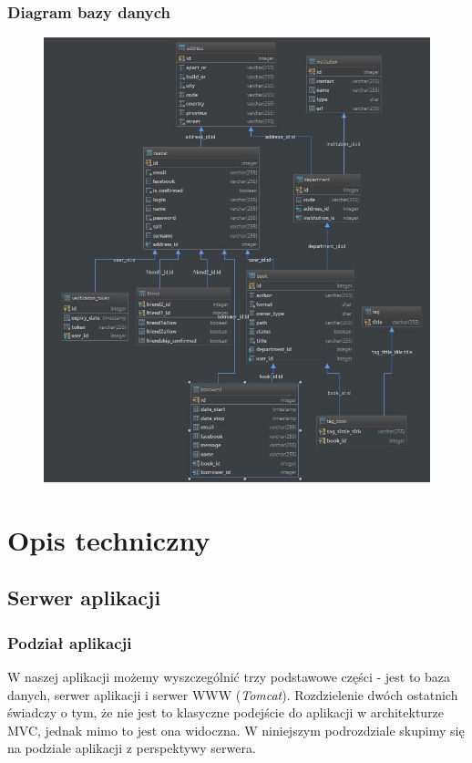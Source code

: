 \documentclass{report}
\begin{document}
		\newpage
		\subsection{Diagram bazy danych}

			\begin{figure}[!htb]
				\centering
				\includegraphics[width=1.\textwidth]{bookaDB.jpg}
			\end{figure}

\chapter{Opis techniczny}

	\section{Serwer aplikacji}
	
		\subsection{Podział aplikacji}

			W naszej aplikacji możemy wyszczególnić trzy podstawowe części - jest to baza danych, serwer aplikacji  i serwer WWW (\textit{Tomcat}). Rozdzielenie dwóch ostatnich świadczy o tym, że nie jest to klasyczne podejście do aplikacji w architekturze MVC, jednak mimo to jest ona widoczna. W niniejszym podrozdziale skupimy się na podziale aplikacji z perspektywy serwera.
			
\end{document}
